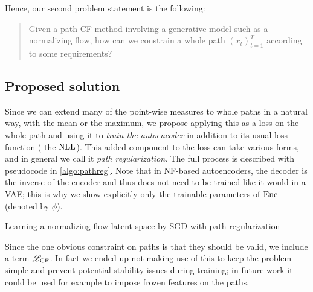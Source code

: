 \documentclass[../main.tex]{subfiles}
\begin{document}
Hence, our second problem statement is the following:
\begin{quote}
Given a path CF method involving a generative model such as a normalizing flow,
how can we constrain a whole path $(x_t)_{t=1}^T$ according to some requirements?
\end{quote}

\subsection{Proposed solution}

Since we can extend many of the point-wise measures to whole paths in a natural way, \eg{} with the mean or the maximum, we propose applying this as a loss on the whole path and using it to \emph{train the autoencoder} in addition to its usual loss function (\eg{} the $\text{NLL}$).
This added component to the loss can take various forms, and in general we call it \emph{path regularization}.
The full process is described with pseudocode in \autoref{algo:pathreg}.
Note that in NF-based autoencoders, the decoder is the inverse of the encoder and thus does not need to be trained like it would in a VAE; this is why we show explicitly only the trainable parameters of $\operatorname{Enc}$ (denoted by $\phi$).

\begin{algorithm}
\caption{Learning a normalizing flow latent space by SGD with path regularization}
\label{algo:pathreg}
\end{algorithm}

Since the one obvious constraint on paths is that they should be valid, we include a term $\mathscr{L}_\text{CF}$.
In fact we ended up not making use of this to keep the problem simple and prevent potential stability issues during training;
in future work it could be used for example to impose frozen features on the paths.
\end{document}
